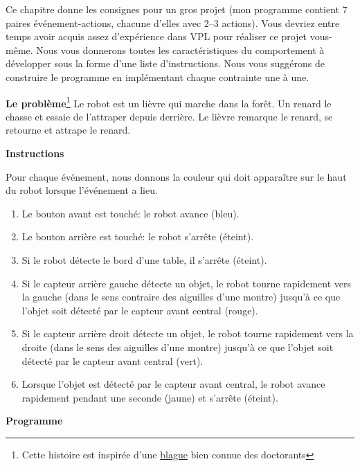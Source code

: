 \label{ch.rabbit}

Ce chapitre donne les consignes pour un gros projet (mon programme
contient 7 paires événement-actions, chacune d'elles avec 2--3
actions).
Vous devriez entre temps avoir acquis assez d'expérience dans VPL
pour réaliser ce projet vous-même. Nous vous donnerons toutes les
caractéristiques du comportement à développer sous la forme d'une
liste d'instructions. Nous vous suggérons de construire le programme en
implémentant chaque contrainte une à une.

\textbf{Le problème}\footnote{Cette histoire est inspirée d'une \href{
http://www.cs.hmc.edu/~fleck/parable.html}{blague} bien connue
des doctorants}
Le robot est un lièvre qui marche dans la forêt.
Un renard le chasse et essaie de l'attraper depuis derrière.
Le lièvre remarque le renard, se retourne et attrape le renard.


\textbf{Instructions}

Pour chaque événement, nous donnons la couleur qui doit apparaître
sur le haut du robot lorsque l'événement a lieu.

\begin{enumerate}
\item Le bouton avant est touché: le robot avance (bleu).
\item Le bouton arrière est touché: le robot s'arrête (éteint).
\item Si le robot détecte le bord d'une table, il s'arrête (éteint).
\item Si le capteur arrière gauche détecte un objet, le robot tourne rapidement
vers la gauche (dans le sens contraire des aiguilles d'une montre) jusqu'à ce que
l'objet soit détecté par le capteur avant central (rouge).
\item Si le capteur arrière droit détecte un objet, le robot tourne rapidement
vers la droite (dans le sens des aiguilles d'une montre)
jusqu'à ce que l'objet soit détecté par le capteur avant central (vert).
\item Lorsque l'objet est détecté par le capteur avant central, le
robot avance rapidement pendant une seconde (jaune) et s'arrête (éteint).
\end{enumerate}

{\raggedleft \hfill \textbf{Programme} }
